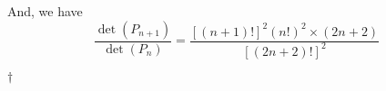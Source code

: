 \documentclass[a4paper,12pt]{article}
\begin{document}
\begin{enumerate}
    And, we have \begin{equation}
        \frac{\det(P_{n + 1})}{\det(P_{n})} = \frac{[(n + 1)!]^2(n!)^2 \times (2n + 2)}{[(2n + 2)!]^2}
    \end{equation}
    \begin{answer}{$\dag$}\begin{equation}

\end{equation}
\end{answer}
\end{enumerate}
\end{document}
